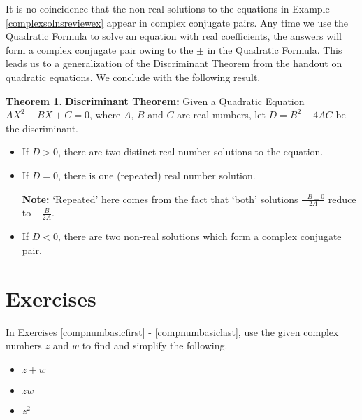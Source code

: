 \documentclass[11pt]{article}
\theoremstyle{definition}  %
\newtheorem{thm}{\bf Theorem}
\newcommand{\bbm}{\begin{boxedminipage}{6.41in}}
\newcommand{\ebm}{\end{boxedminipage}}
\begin{document}
It is no coincidence that the non-real solutions to the equations in Example \ref{complexsolnsreviewex} appear in  complex conjugate pairs. Any time we use the Quadratic Formula to solve an equation with \underline{real} coefficients, the answers will form a  complex conjugate pair owing to the $\pm$ in the Quadratic Formula.  This leads us to a generalization of the Discriminant Theorem from the handout on quadratic equations. We conclude with the following result.

\colorbox{ResultColor}{\bbm
\begin{thm} \textbf{Discriminant Theorem:} \label{discriminanttheoremcomplexversion} Given a Quadratic Equation $AX^2 + BX + C = 0$, where $A$, $B$ and $C$ are real numbers, let $D = B^2 - 4AC$ be the discriminant.

\begin{itemize}

\item  If $D > 0$, there are two distinct real number solutions to the equation. 

\item  If $D = 0$, there is one (repeated) real number solution.  

\textbf{Note:}  `Repeated' here comes from the fact that `both' solutions $\frac{-B \pm 0}{2A}$ reduce to $-\frac{B}{2A}$.

\item  If $D < 0$, there are two non-real solutions which form a complex conjugate pair.

\end{itemize}

\end{thm}
\ebm}

\medskip


\newpage

\section{Exercises}

In Exercises \ref{compnumbasicfirst} - \ref{compnumbasiclast}, use the given complex numbers $z$ and $w$ to find and simplify the following. 

\begin{multicols}{3}

\begin{itemize}

\item $z+w$
\item $zw$
\item $z^2$

\end{itemize}

\end{multicols}
\end{document}
